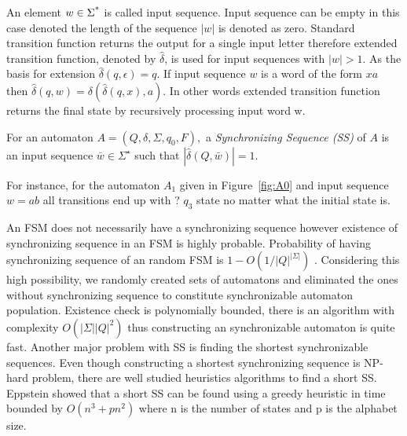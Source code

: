 \documentclass[runningheads]{llncs}
\begin{document}
\par An element $w \in \Sigma \textsuperscript{*}$ is called input sequence. Input sequence can be empty in this case denoted the length of the sequence $|w|$ is denoted as zero. Standard transition function returns the output for a single input letter therefore extended transition function, denoted by $\hat{\delta}$, is used for input sequences with $|w| > 1$. As the basis for extension  $\hat{\delta} (q, \epsilon) = q$. If input sequence $w$ is a word of the form $xa$ then $\hat{\delta} (q, w) = \delta(\hat{\delta}(q, x), a)$. In other words extended transition function returns the final state by recursively processing input word w.

\begin{definition}
For an automaton $A = (Q,\delta, \Sigma, q_{0}, F),$ a {\em Synchronizing Sequence (SS)} of $A$ is an input sequence $\bar{w}\in \Sigma^\star$ such that $|\hat{\delta}(Q,\bar{w})| = 1$.
\end{definition}

For instance, for the automaton $A_{1}$ given in Figure~\ref{fig:A0} and input sequence $w = ab$ all transitions end up with ? $q_{3}$ state no matter what the initial state is.

\par An FSM does not necessarily have a synchronizing sequence however existence of synchronizing sequence in an FSM is highly probable. Probability of having synchronizing sequence of an random FSM is $1-O(1/|Q|^{|\Sigma|})$
\cite{berlinkov}. Considering this high possibility, we randomly created sets of automatons and eliminated the ones without synchronizing sequence to constitute synchronizable automaton population. Existence check is polynomially bounded, there is an algorithm with complexity $O(|\Sigma||Q|^2)$ \cite{eppstein_1990} thus constructing an synchronizable automaton is quite fast. Another major problem with SS is finding the shortest synchronizable sequences.  Even though constructing a shortest synchronizing sequence is NP-hard problem, there are well studied heuristics algorithms to find a short SS. Eppstein showed that a short SS can be found using a greedy heuristic in time bounded by $O(n^3 + pn^2)$ where n is the number of states and p is the alphabet size\cite{eppstein_1990}.
\end{document}
